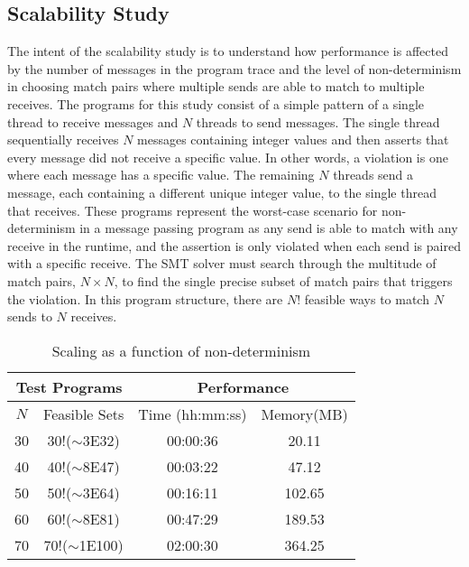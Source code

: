 \subsection{Scalability Study}

The intent of the scalability study is to understand how performance
is affected by the number of messages in the program trace and the
level of non-determinism in choosing match pairs where multiple sends
are able to match to multiple receives. The programs for this study
consist of a simple pattern of a single thread to receive messages and
$N$ threads to send messages. The single thread sequentially receives
$N$ messages containing integer values and then asserts that every
message did not receive a specific value. In other words, a violation
is one where each message has a specific value.  The remaining $N$
threads send a message, each containing a different unique integer
value, to the single thread that receives. These programs represent
the worst-case scenario for non-determinism in a message passing
program as any send is able to match with any receive in the runtime,
and the assertion is only violated when each send is paired with a
specific receive. The SMT solver must search through the multitude of
match pairs, $N \times N$, to find the single precise subset of
match pairs that triggers the violation. In this program structure,
there are $N!$ feasible ways to match $N$ sends to $N$ receives.

\begin{table}[t]
\begin{center}
\scriptsize
\caption{Scaling as a function of non-determinism \label{table:first}}
\begin{tabular}{|c|c|c|c|}
		\hline
         \multicolumn{2}{|c|}{Test Programs} & \multicolumn{2}{|c|}{Performance} \\ \hline
          $N$ & Feasible Sets &  Time (hh:mm:ss) & Memory(MB) \\ \hline
30& 30!($\sim$3E32)& 00:00:36&        20.11 \\
40& 40!($\sim$8E47)& 00:03:22&        47.12 \\
50& 50!($\sim$3E64)& 00:16:11&       102.65 \\
60& 60!($\sim$8E81)& 00:47:29&       189.53 \\
70& 70!($\sim$1E100)& 02:00:30&         364.25  \\
         \hline
		\end{tabular}
\end{center}
\end{table}

